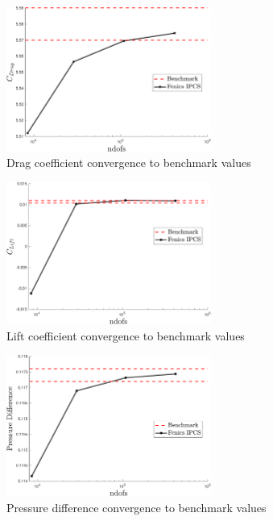 \documentclass{article}
\begin{document}
\FloatBarrier
\begin{figure}[h]
\centering
	\includegraphics[width=0.6\textwidth]{drag-crop}
	\caption{Drag coefficient convergence to benchmark values}
	\label{fig:drag}
\end{figure}
\FloatBarrier


\FloatBarrier
\begin{figure}[h]
\centering
	\includegraphics[width=0.6\textwidth]{lift-crop}
	\caption{Lift coefficient convergence to benchmark values}
	\label{fig:lift}
\end{figure}
\FloatBarrier



\FloatBarrier
\begin{figure}[h]
\centering
	\includegraphics[width=0.6\textwidth]{p_diff-crop}
	\caption{Pressure difference convergence to benchmark values}
	\label{fig:p_diff}
\end{figure}
\FloatBarrier
\end{document}
